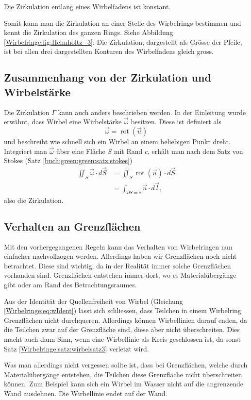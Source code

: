 \begin{satz}
    \label{Wirbelringe:satz:wirbelsatz3}
    Die Zirkulation entlang eines Wirbelfadens ist konstant. 
\end{satz}

Somit kann man die Zirkulation an einer Stelle des Wirbelrings bestimmen und kennt die Zirkulation des ganzen Rings.
Siehe Abbildung \ref{Wirbelringe:fig:Helmholtz_3}: 
Die Zirkulation, dargestellt als Grösse der Pfeile, ist bei allen drei dargestellten Konturen des Wirbelfadens gleich gross.

\subsection{Zusammenhang von der Zirkulation und Wirbelstärke\label{Wirbelringe:Stokes}}

Die Zirkulation \(\Gamma\) kann auch anders beschrieben werden. 
In der Einleitung wurde erwähnt, dass Wirbel eine Wirbelstärke \(\vec{\omega}\) besitzen.
Diese ist definiert als
\[
\vec{\omega}
=
\operatorname{rot}(\vec{u})
\]
und beschreibt wie schnell sich ein Wirbel an einem beliebigen Punkt dreht.
Integriert man \(\vec{\omega}\) über eine Fläche \(S\) mit Rand \(c\), erhält man nach dem Satz von Stokes (Satz \ref{buch:green:green:satz:stokes})
\begin{align*}
\iint_{S} \vec{\omega} \cdot d \vec{S}
&=
\iint_{S} \operatorname{rot}(\vec{u})\cdot  d \vec{S}\\
&=
\int_{\partial S = c} \vec{u} \cdot d\vec{l},
\end{align*}
also die Zirkulation.

\subsection{Verhalten an Grenzflächen\label{Wirbelringe:Grenzflaechen}}

Mit den vorhergegangenen Regeln kann das Verhalten von Wirbelringen nun einfacher nachvollzogen werden.
Allerdings haben wir Grenzflächen noch nicht betrachtet.
Diese sind wichtig, da in der Realität immer solche Grenzflächen vorhanden sind.
Grenzflächen entstehen immer dort, wo es Materialübergänge gibt oder am Rand des Betrachtungsraumes.

Aus der Identität der Quellenfreiheit von Wirbel (Gleichung \eqref{Wirbelringe:eq:wIdent}) lässt sich schliessen, dass Teilchen in einem Wirbelring Grenzflächen nicht durchqueren.
Allerdings können Wirbellinien darauf enden, da die Teilchen zwar auf der Grenzfläche sind, diese aber nicht überschreiten.
Dies macht auch dann Sinn, wenn eine Wirbellinie als Kreis geschlossen ist, da sonst Satz \ref{Wirbelringe:satz:wirbelsatz3} verletzt wird.

Was man allerdings nicht vergessen sollte ist, dass bei Grenzflächen, welche durch Materialübergänge entstehen, die Teilchen diese Grenzfläche nicht überschreiten können.
Zum Beispiel kann sich ein Wirbel im Wasser nicht auf die angrenzende Wand ausdehnen.
Die Wirbellinie endet auf der Wand.
